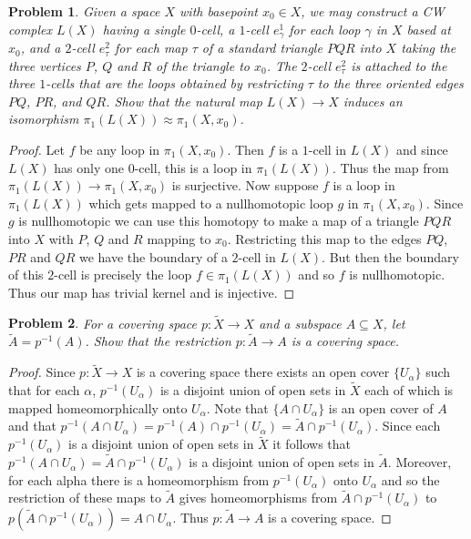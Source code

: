 \documentclass{article}
\newtheorem{problem}{Problem}
\begin{document}
\begin{problem}
Given a space $X$ with basepoint $x_0 \in X$, we may construct a CW complex $L(X)$ having a single $0$-cell, a $1$-cell $e_{\gamma}^1$ for each loop $\gamma$ in $X$ based at $x_0$, and a $2$-cell $e_{\tau}^2$ for each map $\tau$ of a standard triangle $PQR$ into $X$ taking the three vertices $P$, $Q$ and $R$ of the triangle to $x_0$. The $2$-cell $e_{\tau}^2$ is attached to the three $1$-cells that are the loops obtained by restricting $\tau$ to the three oriented edges $PQ$, $PR$, and $QR$. Show that the natural map $L(X) \to X$ induces an isomorphism $\pi_1(L(X)) \approx \pi_1(X,x_0)$.
\end{problem}
\begin{proof}
Let $f$ be any loop in $\pi_1(X,x_0)$. Then $f$ is a $1$-cell in $L(X)$ and since $L(X)$ has only one $0$-cell, this is a loop in $\pi_1(L(X))$. Thus the map from $\pi_1(L(X)) \to \pi_1(X,x_0)$ is surjective. Now suppose $f$ is a loop in $\pi_1(L(X))$ which gets mapped to a nullhomotopic loop $g$ in $\pi_1(X,x_0)$. Since $g$ is nullhomotopic we can use this homotopy to make a map of a triangle $PQR$ into $X$ with $P$, $Q$ and $R$ mapping to $x_0$. Restricting this map to the edges $PQ$, $PR$ and $QR$ we have the boundary of a $2$-cell in $L(X)$. But then the boundary of this $2$-cell is precisely the loop $f \in \pi_1(L(X))$ and so $f$ is nullhomotopic. Thus our map has trivial kernel and is injective.
\end{proof}

\begin{problem}
For a covering space $p : \widetilde{X} \to X$ and a subspace $A \subseteq X$, let $\widetilde{A} = p^{-1}(A)$. Show that the restriction $p : \widetilde{A} \to A$ is a covering space.
\end{problem}
\begin{proof}
Since $p : \widetilde{X} \to X$ is a covering space there exists an open cover $\{U_{\alpha}\}$ such that for each $\alpha$, $p^{-1}(U_{\alpha})$ is a disjoint union of open sets in $\widetilde{X}$ each of which is mapped homeomorphically onto $U_{\alpha}$. Note that $\{A \cap U_{\alpha}\}$ is an open cover of $A$ and that $p^{-1}(A \cap U_{\alpha}) = p^{-1}(A) \cap p^{-1}(U_{\alpha}) = \widetilde{A} \cap p^{-1}(U_{\alpha})$. Since each $p^{-1}(U_{\alpha})$ is a disjoint union of open sets in $\widetilde{X}$ it follows that $p^{-1}(A \cap U_{\alpha}) = \widetilde{A} \cap p^{-1}(U_{\alpha})$ is a disjoint union of open sets in $\widetilde{A}$. Moreover, for each alpha there is a homeomorphism from $p^{-1}(U_{\alpha})$ onto $U_{\alpha}$ and so the restriction of these maps to $\widetilde{A}$ gives homeomorphisms from $\widetilde{A} \cap p^{-1}(U_{\alpha})$ to $p(\widetilde{A} \cap p^{-1}(U_{\alpha})) = A \cap U_{\alpha}$. Thus $p : \widetilde{A} \to A$ is a covering space.
\end{proof}
\end{document}
